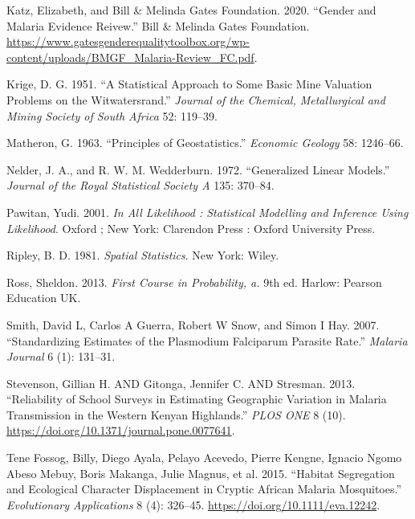 \documentclass[
  letterpaper,
]{krantz}
\newlength{\cslhangindent}
\newlength{\cslentryspacingunit} %
\newenvironment{CSLReferences}[2] %
 {%
  \setlength{\parindent}{0pt}
  \ifodd #1
  \let\oldpar\par
  \def\par{\hangindent=\cslhangindent\oldpar}
  \fi
  \setlength{\parskip}{#2\cslentryspacingunit}
 }%
 {}
\begin{document}
\begin{CSLReferences}{1}{0}
\leavevmode{}%
Katz, Elizabeth, and Bill \& Melinda Gates Foundation. 2020. {``Gender
and Malaria Evidence Reivew.''} Bill \& Melinda Gates Foundation.
\url{https://www.gatesgenderequalitytoolbox.org/wp-content/uploads/BMGF_Malaria-Review_FC.pdf}.

\leavevmode{}%
Krige, D. G. 1951. {``A Statistical Approach to Some Basic Mine
Valuation Problems on the Witwatersrand.''} \emph{Journal of the
Chemical, Metallurgical and Mining Society of South Africa} 52: 119--39.

\leavevmode{}%
Matheron, G. 1963. {``Principles of Geostatistics.''} \emph{Economic
Geology} 58: 1246--66.

\leavevmode{}%
Nelder, J. A., and R. W. M. Wedderburn. 1972. {``Generalized Linear
Models.''} \emph{Journal of the Royal Statistical Society A} 135:
370--84.

\leavevmode{}%
Pawitan, Yudi. 2001. \emph{In All Likelihood : Statistical Modelling and
Inference Using Likelihood}. Oxford ; New York: Clarendon Press : Oxford
University Press.

\leavevmode{}%
Ripley, B. D. 1981. \emph{Spatial Statistics}. New York: Wiley.

\leavevmode{}%
Ross, Sheldon. 2013. \emph{First Course in Probability, a.} 9th ed.
Harlow: Pearson Education UK.

\leavevmode{}%
Smith, David L, Carlos A Guerra, Robert W Snow, and Simon I Hay. 2007.
{``Standardizing Estimates of the Plasmodium Falciparum Parasite
Rate.''} \emph{Malaria Journal} 6 (1): 131--31.

\leavevmode{}%
Stevenson, Gillian H. AND Gitonga, Jennifer C. AND Stresman. 2013.
{``Reliability of School Surveys in Estimating Geographic Variation in
Malaria Transmission in the Western Kenyan Highlands.''} \emph{PLOS ONE}
8 (10). \url{https://doi.org/10.1371/journal.pone.0077641}.

\leavevmode{}%
Tene Fossog, Billy, Diego Ayala, Pelayo Acevedo, Pierre Kengne, Ignacio
Ngomo Abeso Mebuy, Boris Makanga, Julie Magnus, et al. 2015. {``Habitat
Segregation and Ecological Character Displacement in Cryptic African
Malaria Mosquitoes.''} \emph{Evolutionary Applications} 8 (4): 326--45.
\url{https://doi.org/10.1111/eva.12242}.


\end{CSLReferences}
\end{document}
